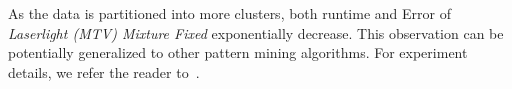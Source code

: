 As the data is partitioned into more clusters, both runtime and Error of \emph{Laserlight (MTV) Mixture Fixed} exponentially decrease.
This observation can be potentially generalized to other pattern mining algorithms.
For experiment details, we refer the reader to~\cite{DBLP:journals/corr/abs-1809-00405}.
